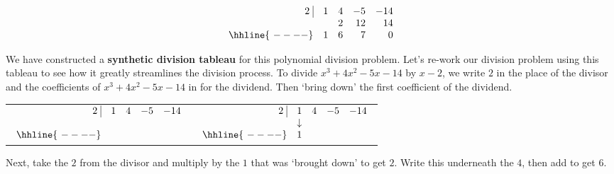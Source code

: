 \[ \begin{array}{rrrrr}


  2 \, \, \vline& 1 & 4 & -5  & -14 \\

   &&   2 &   12 &   14 \\ \hhline{~----} 
  & 1  &   6  &  7 &  0  \\  
\end{array}\]



We have constructed a \textbf{synthetic division tableau} for this polynomial division problem.  Let's re-work our division problem using this tableau to see how it greatly streamlines the division process.  To divide $x^3+4x^2-5x-14$ by $x-2$, we write $2$ in the place of the divisor and the coefficients of $x^3+4x^2-5x-14$ in for the dividend.  Then `bring down' the first coefficient of the dividend.

\bigskip

\begin{center}

\begin{tabular}{cc}

$ \begin{array}{rrrrr}


  2 \, \, \vline& 1 & 4 & -5  & -14 \\

   &  &    &    &  \\ \hhline{~----} 
  &   &     &   &    \\  
\end{array}$  \hspace{1in}
&


$ \begin{array}{rrrrr}


  2 \, \, \vline& 1 & 4 & -5  & -14 \\

   & \downarrow &    &    &  \\ \hhline{~----} 
  & 1  &     &   &    \\  
\end{array}$ \\

\end{tabular}

\end{center}

\bigskip

Next, take the $2$ from the divisor and multiply by the $1$ that was `brought down' to get $2$.  Write this underneath the $4$, then add to get $6$.

